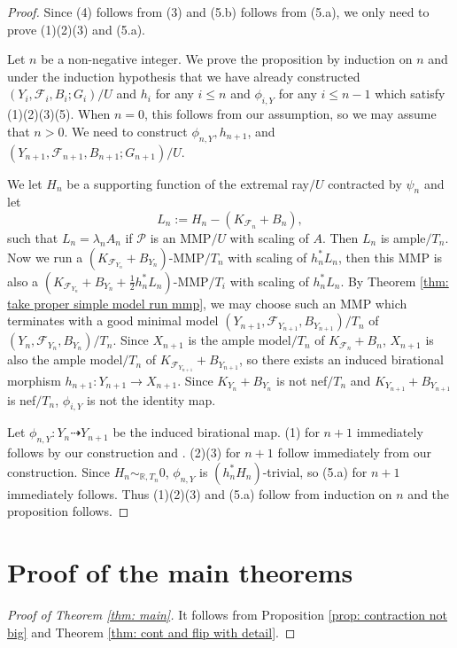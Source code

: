 \documentclass[11pt]{amsart}
\numberwithin{equation}{section}
\newcommand{\Ff}{\mathcal{F}}
\theoremstyle{definition}
\theoremstyle{definition}
\theoremstyle{definition}
\begin{document}
\begin{proof}
Since (4) follows from (3) and (5.b) follows from (5.a), we only need to prove (1)(2)(3) and (5.a).

Let $n$ be a non-negative integer. We prove the proposition by induction on $n$ and under the induction hypothesis that we have already constructed $(Y_i,\Ff_i,B_i;G_i)/U$ and $h_i$ for any $i\leq n$ and $\phi_{i,Y}$ for any $i\leq n-1$ which satisfy (1)(2)(3)(5). When $n=0$, this follows from our assumption, so we may assume that $n>0$. We need to construct $\phi_{n,Y},h_{n+1}$, and $(Y_{n+1},\Ff_{n+1},B_{n+1};G_{n+1})/U$.

We let $H_n$ be a supporting function of the extremal ray$/U$ contracted by $\psi_n$ and let  
$$L_n:=H_n-(K_{\Ff_n}+B_n),$$
such that $L_n=\lambda_nA_n$ if $\mathcal{P}$ is an MMP$/U$ with scaling of $A$. Then $L_n$ is ample$/T_n$. Now we run a $(K_{\Ff_{Y_n}}+B_{Y_n})$-MMP$/T_n$ with scaling of $h_n^*L_n$, then this MMP is also a $(K_{\Ff_{Y_n}}+B_{Y_n}+\frac{1}{2}h_n^*L_n)$-MMP$/T_i$ with scaling of $h_n^*L_n$. By Theorem \ref{thm: take proper simple model run mmp}, we may choose such an MMP which terminates with a good minimal model $(Y_{n+1},\Ff_{Y_{n+1}},B_{Y_{n+1}})/T_n$ of $(Y_{n},\Ff_{Y_{n}},B_{Y_{n}})/T_n$. Since $X_{n+1}$ is the ample model$/T_n$ of $K_{\Ff_n}+B_n$, $X_{n+1}$ is also the ample model$/T_n$ of $K_{\Ff_{Y_{n+1}}}+B_{Y_{n+1}}$, so there exists an induced birational morphism $h_{n+1}: Y_{n+1}\rightarrow X_{n+1}$. Since $K_{Y_n}+B_{Y_n}$ is not nef$/T_n$ and $K_{Y_{n+1}}+B_{Y_{n+1}}$ is nef$/T_n$, $\phi_{i,Y}$ is not the identity map.

Let $\phi_{n,Y}: Y_n\dashrightarrow Y_{n+1}$ be the induced birational map. (1) for $n+1$ immediately follows by our construction and \cite[Lemma 9.1.4]{CHLX23}. (2)(3) for $n+1$ follow immediately from our construction. Since $H_n\sim_{\mathbb R,T_n}0$, $\phi_{n,Y}$ is $(h_n^*H_n)$-trivial, so (5.a) for $n+1$ immediately follows. Thus (1)(2)(3) and (5.a) follow from induction on $n$ and the proposition follows.
\end{proof}




\section{Proof of the main theorems}\label{sec: proof of main theorem}

\begin{proof}[Proof of Theorem \ref{thm: main}]
     It follows from Proposition \ref{prop: contraction not big} and Theorem \ref{thm: cont and flip with detail}.
\end{proof}
\end{document}

